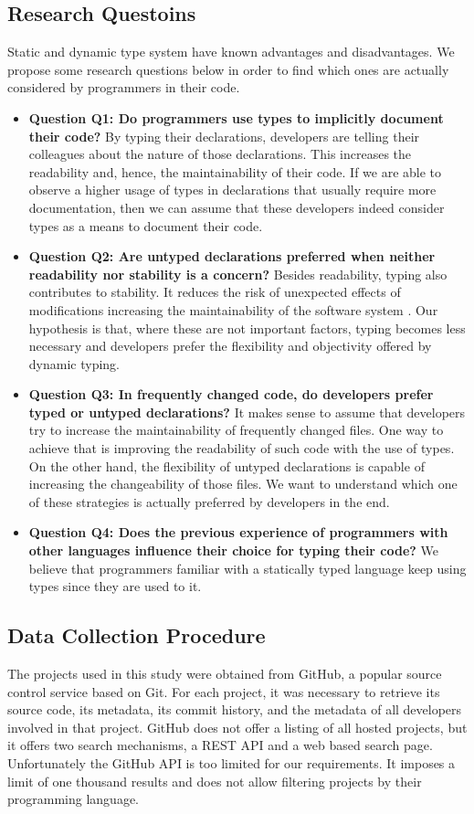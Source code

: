 \documentclass[preprint]{sigplanconf}
\begin{document}
\subsection{Research Questoins\label{questions}}
Static and dynamic type system have known advantages and disadvantages.
We propose some research questions below in order to find which ones are actually considered by programmers in their code.

\begin{itemize}
	\item \textbf{Question Q1: Do programmers use types to implicitly document their code?} By typing their declarations, developers are telling their colleagues about the nature of those declarations. This increases the readability and, hence, the maintainability of their code. If we are able to observe a higher usage of types in declarations that usually require more documentation, then we can assume that these developers indeed consider types as a means to document their code.
	\item \textbf{Question Q2: Are untyped declarations preferred when neither readability nor stability is a concern?} Besides readability, typing also contributes to stability. It reduces the risk of unexpected effects of modifications increasing the maintainability of the software system \cite{Iso2004}. Our hypothesis is that, where these are not important factors, typing becomes less necessary and developers prefer the flexibility and objectivity offered by dynamic typing. 
	\item \textbf{Question Q3: In frequently changed code, do developers prefer typed or untyped declarations?} It makes sense to assume that developers try to increase the maintainability of frequently changed files. One way to achieve that is improving the readability of such code with the use of types. On the other hand, the flexibility of untyped declarations is capable of increasing the changeability of those files. We want to understand which one of these strategies is actually preferred by developers in the end.
	\item \textbf{Question Q4: Does the previous experience of programmers with other languages influence their choice for typing their code?} We believe that programmers familiar with a statically typed language keep using types since they are used to it. 
\end{itemize}

\subsection{Data Collection Procedure\label{dataCollection}}
The projects used in this study were obtained from GitHub, a popular source control service based on Git.
For each project, it was necessary to retrieve its source code, its metadata, its commit history, and the metadata of all developers involved in that project.
GitHub does not offer a listing of all hosted projects, but it offers two search mechanisms, a REST API and a web based search page.
Unfortunately the GitHub API is too limited for our requirements.
It imposes a limit of one thousand results and does not allow filtering projects by their programming language.
\end{document}
